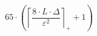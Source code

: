 \[65 \cdot \left(\left\lceil \frac{8 \cdot L \cdot \Delta}{\varepsilon^{2}} \right\rceil_{+} + 1\right)\]
